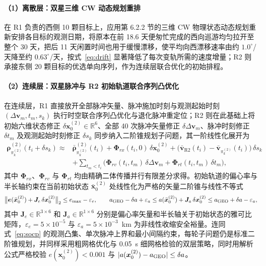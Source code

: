 \paragraph{（1）离散层：双星三维 CW 动态规划重排}

在 R1 负责的西侧 10 颗目标上，应用第 6.2.2 节的三维 CW 物理状态动态规划重新安排各目标的观测日期，将原本在前 18.6 天便匆忙完成的西向巡游均匀拉开至整个 30 天，把后 11 天闲置时间也用于缓慢漂移，使平均向西漂移速率由约 $1.0^\circ$/天降至约 $0.63^\circ$/天，按式~\eqref{eq:drift} 显著降低了每次变轨所需的速度增量；R2 则承接东侧 20 颗目标的优选单向序列，作为连续层联合优化的初始排程。

\paragraph{（2）连续层：双星脉冲与 R2 初始轨道联合序列凸优化}

在连续层，R1 直接放开全部脉冲矢量、脉冲施加时刻与观测起始时刻 $(\Delta\bm v_m, t_m, s_k)$ 执行时空联合序列凸优化与退化脉冲重定位；R2 则在此基础上将初始六维状态修正 $\delta\bm x_0^{(2)} \in \mathbb R^6$、全部 40 次脉冲矢量修正 $\delta\Delta\bm v_m$、脉冲时刻修正 $\delta t_m$ 及观测起始时刻修正 $\delta s_k$ 同步纳入二阶锥规划子问题，其一阶线性化展开为
\begin{equation}
  \begin{aligned}
    \bm\rho^{(2)}_{\pi^{(2)}_k}(t_i + \delta s_k) \approx{} & \bar{\bm\rho}^{(2)}_{\pi^{(2)}_k}(t_i) + \bm\Phi_{rx}(t_i, 0)\,\delta\bm x_0^{(2)} + \big(\bar{\bm v}_{\mathrm{R2}}(t_i) - \bar{\bm v}_{\pi^{(2)}_k}(t_i)\big)\,\delta s_k \\
    & + \sum_{t_m < t_i} \Big(\bm\Phi_{rv}(t_i, t_m)\,\delta\Delta\bm v_m + \bm\Phi_{rt}(t_i, t_m)\,\delta t_m\Big) ,
  \end{aligned}
  \label{eq:q3lin}
\end{equation}
其中 $\bm\Phi_{rx}$、$\bm\Phi_{rv}$ 与 $\bm\Phi_{rt}$ 均由精确二体传播并行有限差分求得。初始轨道的偏心率与半长轴约束在当前初始状态 $\bar{\bm x}_0^{(2)}$ 处线性化为严格的矢量二阶锥与线性不等式
\begin{equation}
  \big\|\bm e(\bar{\bm x}_0^{(2)}) + \bm J_e\,\delta\bm x_0^{(2)}\big\|_2 \le e_{\max} - \varepsilon_e,\qquad
  a_{\mathrm{GEO}} - \delta a + \varepsilon_a \le a(\bar{\bm x}_0^{(2)}) + \bm J_a\,\delta\bm x_0^{(2)} \le a_{\mathrm{GEO}} + \delta a - \varepsilon_a ,
  \label{eq:q3initlin}
\end{equation}
其中 $\bm J_e \in \mathbb R^{3\times 6}$ 和 $\bm J_a \in \mathbb R^{1\times 6}$ 分别是偏心率矢量和半长轴关于初始状态的雅可比矩阵，$\varepsilon_e = 5\times 10^{-5}$ 与 $\varepsilon_a = 5\times 10^{-3}$~km 为非线性收缩安全裕量。连同式~\eqref{eq:socp} 的观测凸集、单次脉冲上界和最小间隔约束，每轮子问题仍是标准二阶锥规划，并同样采用粗网格优化与 0.05~s 细网格检验的双层策略，同时用解析公式严格校验 $e(\bm x_0^{(2)}) < 0.001$ 与 $|a(\bm x_0^{(2)}) - a_{\mathrm{GEO}}| \le \delta a$。

